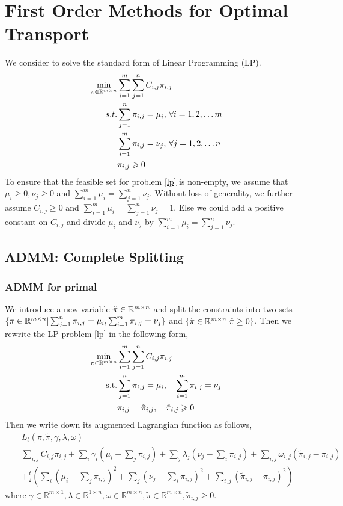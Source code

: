 \documentclass[english]{pkupaper}
\newenvironment{eqt}{\begin{equation}\begin{aligned}}{\end{aligned}\end{equation}}
\begin{document}
\section{First Order Methods for Optimal Transport}
\label{sec:2}
We consider to solve the standard form of Linear Programming (LP).
\begin{equation}
\label{lp}
\begin{aligned}
\min\limits_{\pi\in\mathbb{R}^{m\times n}}&\sum_{i=1}^m\sum_{j=1}^nC_{i,j}\pi_{i,j}\\
s.t.&\sum_{j=1}^n\pi_{i,j}=\mu_i, \, \forall i=1, 2, \dots m\\
&\sum_{i=1}^m\pi_{i,j}=\nu_j , \, \forall j=1, 2, \dots n\\
&\pi_{i,j}\geqslant0 
\end{aligned}
\end{equation}
To ensure that the feasible set for problem \ref{lp} is non-empty, we assume that $\mu_i\geqslant 0, \nu_j\geqslant0$ and $\sum_{i=1}^m\mu_i=\sum_{j=1}^n\nu_j$. Without loss of generality, we further assume $C_{i,j}\geqslant 0$ and $\sum_{i=1}^m\mu_i=\sum_{j=1}^n\nu_j=1$. Else we could add a positive constant on $C_{i, j}$ and divide $\mu_i$ and $\nu_j$ by $\sum_{i=1}^m\mu_i=\sum_{j=1}^n\nu_j$.

\subsection{ADMM: Complete Splitting}
\subsubsection{ADMM for primal}
We introduce a new variable $\tilde \pi \in \mathbb{R}^{m\times n}$ and split the constraints into two sets $\{\pi\in \mathbb{R}^{m\times n}| \sum_{j=1}^n\pi_{i,j}=\mu_i, \sum_{i=1}^m\pi_{i,j}=\nu_j\}$ and $\{\tilde\pi\in \mathbb{R}^{m\times n}|\tilde\pi\geq0\}$. Then we rewrite the LP problem \ref{lp} in the following form,
\begin{equation}
\label{new_lp}
\begin{aligned}
\min\limits_{\pi\in\mathbb{R}^{m\times n}}&\sum_{i=1}^m\sum_{j=1}^nC_{i,j}\pi_{i,j}\\
\text{s.t.}&\sum_{j=1}^n\pi_{i,j}=\mu_i,\quad \sum_{i=1}^m\pi_{i,j}=\nu_j\\
&\pi_{i,j} = \tilde\pi_{i,j}, \quad \tilde\pi_{i,j}\geqslant0 
\end{aligned}
\end{equation}
Then we write down its augmented Lagrangian function as follows,
\begin{eqt}
&L_t(\pi, \tilde{\pi}, \gamma, \lambda, \omega) \\
= &  \sum_{i, j}C_{i,j}\pi_{i,j} + \sum_{i}\gamma_i(\mu_i-\sum_{j}\pi_{i,j}) + \sum_{j}\lambda_j(\nu_j-\sum_i\pi_{i,j}) + \sum_{i, j}\omega_{i,j}(\tilde{\pi}_{i,j}-\pi_{i,j}) \\
&+ \frac{t}{2}\left(\sum_{i}(\mu_i-\sum_{j}\pi_{i,j})^2 + \sum_{j}(\nu_j-\sum_{i}\pi_{i,j})^2 + \sum_{i, j}(\tilde{\pi}_{i,j}-\pi_{i,j})^2\right)
\end{eqt}
where $\gamma\in\mathbb{R}^{m\times 1}, \lambda\in\mathbb{R}^{1\times n}, \omega\in\mathbb{R}^{m\times n}, \tilde{\pi}\in\mathbb{R}^{m\times n}, \tilde{\pi}_{i,j}\geqslant 0$. 
\end{document}
